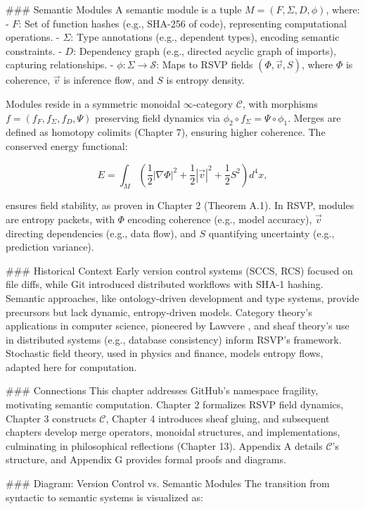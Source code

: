 \documentclass[12pt]{article}
\begin{document}
### Semantic Modules
A semantic module is a tuple $M = (F, \Sigma, D, \phi)$, where:
- $F$: Set of function hashes (e.g., SHA-256 of code), representing computational operations.
- $\Sigma$: Type annotations (e.g., dependent types), encoding semantic constraints.
- $D$: Dependency graph (e.g., directed acyclic graph of imports), capturing relationships.
- $\phi : \Sigma \to \mathcal{S}$: Maps to RSVP fields $(\Phi, \vec{v}, S)$, where $\Phi$ is coherence, $\vec{v}$ is inference flow, and $S$ is entropy density.

Modules reside in a symmetric monoidal $\infty$-category $\mathcal{C}$, with morphisms $f = (f_F, f_\Sigma, f_D, \Psi)$ preserving field dynamics via $\phi_2 \circ f_\Sigma = \Psi \circ \phi_1$. Merges are defined as homotopy colimits (Chapter 7), ensuring higher coherence. The conserved energy functional:

\[
E = \int_M \left( \frac{1}{2} |\nabla \Phi|^2 + \frac{1}{2} |\vec{v}|^2 + \frac{1}{2} S^2 \right) d^4x,
\]

ensures field stability, as proven in Chapter 2 (Theorem A.1). In RSVP, modules are entropy packets, with $\Phi$ encoding coherence (e.g., model accuracy), $\vec{v}$ directing dependencies (e.g., data flow), and $S$ quantifying uncertainty (e.g., prediction variance).

### Historical Context
Early version control systems (SCCS, RCS) focused on file diffs, while Git introduced distributed workflows with SHA-1 hashing. Semantic approaches, like ontology-driven development and type systems, provide precursors but lack dynamic, entropy-driven models. Category theory’s applications in computer science, pioneered by Lawvere \cite{lawvere2009conceptual}, and sheaf theory’s use in distributed systems (e.g., database consistency) inform RSVP’s framework. Stochastic field theory, used in physics and finance, models entropy flows, adapted here for computation.

### Connections
This chapter addresses GitHub’s namespace fragility, motivating semantic computation. Chapter 2 formalizes RSVP field dynamics, Chapter 3 constructs $\mathcal{C}$, Chapter 4 introduces sheaf gluing, and subsequent chapters develop merge operators, monoidal structures, and implementations, culminating in philosophical reflections (Chapter 13). Appendix A details $\mathcal{C}$’s structure, and Appendix G provides formal proofs and diagrams.

### Diagram: Version Control vs. Semantic Modules
The transition from syntactic to semantic systems is visualized as:
\end{document}
